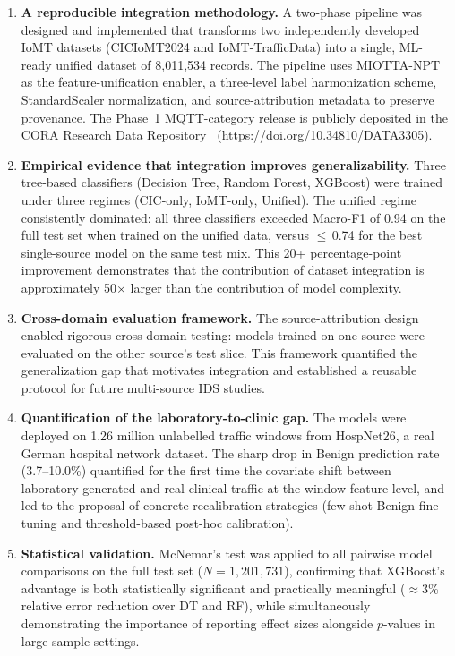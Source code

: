 \begin{enumerate}[nosep]
  \item \textbf{A reproducible integration methodology.}
  A two-phase pipeline was designed and implemented that transforms two independently developed IoMT datasets (CICIoMT2024 and IoMT-TrafficData) into a single, ML-ready unified dataset of 8,011,534 records. The pipeline uses MIOTTA-NPT as the feature-unification enabler, a three-level label harmonization scheme, StandardScaler normalization, and source-attribution metadata to preserve provenance. The Phase~1 MQTT-category release is publicly deposited in the CORA Research Data Repository~\cite{unified_iomt_csuc2026} (\url{https://doi.org/10.34810/DATA3305}).

  \item \textbf{Empirical evidence that integration improves generalizability.}
  Three tree-based classifiers (Decision Tree, Random Forest, XGBoost) were trained under three regimes (CIC-only, IoMT-only, Unified). The unified regime consistently dominated: all three classifiers exceeded Macro-F1 of 0.94 on the full test set when trained on the unified data, versus $\leq$\,0.74 for the best single-source model on the same test mix. This 20+ percentage-point improvement demonstrates that the contribution of dataset integration is approximately 50$\times$ larger than the contribution of model complexity.

  \item \textbf{Cross-domain evaluation framework.}
  The source-attribution design enabled rigorous cross-domain testing: models trained on one source were evaluated on the other source's test slice. This framework quantified the generalization gap that motivates integration and established a reusable protocol for future multi-source IDS studies.

  \item \textbf{Quantification of the laboratory-to-clinic gap.}
  The models were deployed on 1.26 million unlabelled traffic windows from HospNet26, a real German hospital network dataset. The sharp drop in Benign prediction rate (3.7--10.0\%) quantified for the first time the covariate shift between laboratory-generated and real clinical traffic at the window-feature level, and led to the proposal of concrete recalibration strategies (few-shot Benign fine-tuning and threshold-based post-hoc calibration).

  \item \textbf{Statistical validation.}
  McNemar's test was applied to all pairwise model comparisons on the full test set ($N=1{,}201{,}731$), confirming that XGBoost's advantage is both statistically significant and practically meaningful ($\approx$3\% relative error reduction over DT and RF), while simultaneously demonstrating the importance of reporting effect sizes alongside $p$-values in large-sample settings.


\end{enumerate}
